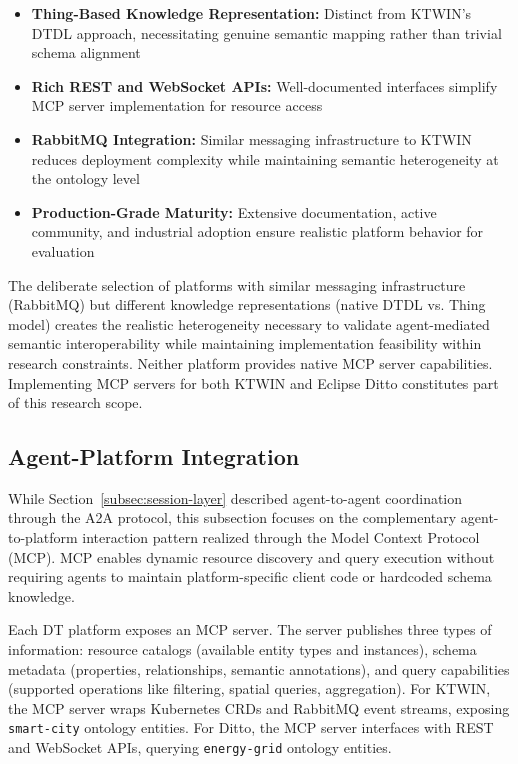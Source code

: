 \begin{itemize}
    \item \textbf{Thing-Based Knowledge Representation:}
    Distinct from KTWIN's DTDL approach,
        necessitating genuine semantic mapping rather than trivial schema alignment
    
    \item \textbf{Rich REST and WebSocket APIs:}
    Well-documented interfaces simplify MCP server implementation for resource access
    
    \item \textbf{RabbitMQ Integration:}
    Similar messaging infrastructure to KTWIN reduces deployment complexity
        while maintaining semantic heterogeneity at the ontology level
    
    \item \textbf{Production-Grade Maturity:}
    Extensive documentation, active community, and industrial adoption
        ensure realistic platform behavior for evaluation
\end{itemize}

The deliberate selection of platforms with similar
    messaging infrastructure (RabbitMQ) but
    different knowledge representations (native DTDL vs. Thing model)
    creates the realistic heterogeneity necessary to
    validate agent-mediated semantic interoperability while
    maintaining implementation feasibility within research constraints.
Neither platform provides native MCP server capabilities.
Implementing MCP servers for both KTWIN and Eclipse Ditto
    constitutes part of this research scope.

\subsection{Agent-Platform Integration}
\label{subsec:agent-interaction-impl}

While Section~\ref{subsec:session-layer} described
    agent-to-agent coordination through the A2A protocol,
    this subsection focuses on the complementary agent-to-platform interaction pattern
    realized through the Model Context Protocol (MCP).
MCP enables dynamic resource discovery and query execution without requiring agents to
    maintain platform-specific client code or
    hardcoded schema knowledge.

Each DT platform exposes an MCP server.
The server publishes three types of information:
    resource catalogs (available entity types and instances),
    schema metadata (properties, relationships, semantic annotations), and
    query capabilities (supported operations like filtering, spatial queries, aggregation).
For KTWIN, the MCP server wraps Kubernetes CRDs and RabbitMQ event streams,
    exposing \texttt{smart-city} ontology entities.
For Ditto, the MCP server interfaces with REST and WebSocket APIs,
    querying \texttt{energy-grid} ontology entities.

